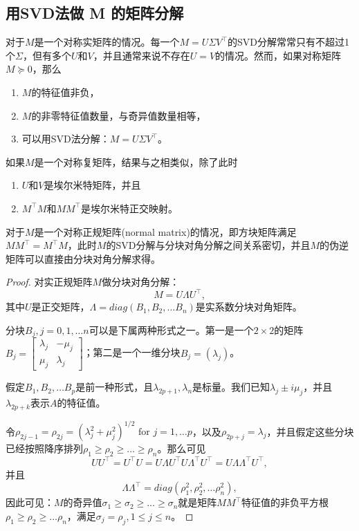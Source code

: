 \begin{subappendices}
\subsection{用SVD法做 M 的矩阵分解}
\label{sec:simple-pseudo-svd-M}
对于$M$是一个对称实矩阵的情况。每一个$M=U \Sigma V^{\top}$的SVD分解常常只有不超过1个$\Sigma$，但有多个$U$和$V$，并且通常来说不存在$U=V$的情况。然而，如果对称矩阵 $M \succeq 0$，那么
\begin{enumerate}
  \item $M$的特征值非负，
  \item $M$的非零特征值数量，与奇异值数量相等，
  \item 可以用SVD法分解：$M=U \Sigma V^{\top}$。
\end{enumerate}
如果$M$是一个对称复矩阵，结果与之相类似，除了此时\begin{enumerate}
\item $U$和$V$是埃尔米特矩阵，并且
\item $M^{\top} M$和$M M^{\top}$是埃尔米特正交映射。
\end{enumerate}

对于$M$是一个对称正规矩阵(normal matrix)的情况，即方块矩阵满足$M M^{\top} = M^{\top} M$，此时$M$的SVD分解与分块对角分解之间关系密切，并且$M$的伪逆矩阵可以直接由分块对角分解求得。
\begin{proof}
  对实正规矩阵$M$做分块对角分解：
  \begin{equation*}
  M = U \Lambda U^{\top},
  \end{equation*}
  其中$U$是正交矩阵，$\Lambda = diag\left(B_1, B_2, \ldots B_n \right)$是实系数分块对角矩阵。

  分块$B_j, j=0,1,\ldots n$可以是下属两种形式之一。第一是一个$2 \times 2$的矩阵$ B_j = \begin{bmatrix} \lambda_{j} & - \mu_j \\ \mu_j & \lambda_j \end{bmatrix}$；第二是一个一维分块$B_j = \left( \lambda_j \right)$。

  假定$B_1, B_2, \ldots B_p$是前一种形式，且$\lambda_{2p+1}, \lambda_{n}$是标量。我们已知$\lambda_j \pm i \mu_j$，并且$\lambda_{2p + k}$表示$A$的特征值。

  令$\rho_{2j-1} = \rho_{2j} = \left( \lambda_j^2 + \mu_j^2 \right)^{1/2}\text{ for }j = 1, \ldots p$，以及$\rho _{2p+j} = \lambda_j$，并且假定这些分块已经按照降序排列$\rho_1 \ge \rho_2 \ge \ldots \ge \rho_n$。那么可见
  \begin{equation*}
    UU^{\top} = U^{\top} U = U \Lambda U^{\top} U \Lambda^{\top} U^{\top} = U \Lambda \Lambda^{\top} U^{\top},
  \end{equation*}
  并且
  \begin{equation*}
    \Lambda \Lambda^{\top} = diag(\rho_1^2, \rho_2^2, \ldots \rho_n^2),
  \end{equation*}
  因此可见：$M$的奇异值$\sigma_1 \ge \sigma_2 \ge \ldots \ge \sigma_n$就是矩阵$MM^{\top}$特征值的非负平方根$\rho_1 \ge \rho_2 \ge \ldots \rho_n$，满足$\sigma_j = \rho_j, 1 \le j \le n$。


\end{proof}
\end{subappendices}
